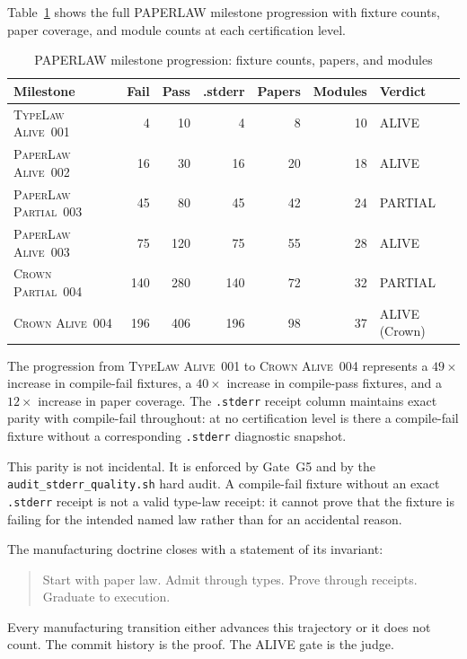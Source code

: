Table~\ref{tab:paperlaw-milestones} shows the full PAPERLAW milestone progression with
fixture counts, paper coverage, and module counts at each certification level.

\begin{table}[ht]
\centering
\caption{PAPERLAW milestone progression: fixture counts, papers, and modules}
\label{tab:paperlaw-milestones}
\begin{tabular}{@{}lrrrrrl@{}}
\toprule
\textbf{Milestone} & \textbf{Fail} & \textbf{Pass} & \textbf{.stderr} & \textbf{Papers} & \textbf{Modules} & \textbf{Verdict} \\
\midrule
\textsc{TypeLaw Alive~001}
  &   4 &  10 &   4 &  8  & 10 & ALIVE \\
\textsc{PaperLaw Alive~002}
  &  16 &  30 &  16 & 20  & 18 & ALIVE \\
\textsc{PaperLaw Partial~003}
  &  45 &  80 &  45 & 42  & 24 & PARTIAL \\
\textsc{PaperLaw Alive~003}
  &  75 & 120 &  75 & 55  & 28 & ALIVE \\
\textsc{Crown Partial~004}
  & 140 & 280 & 140 & 72  & 32 & PARTIAL \\
\textsc{Crown Alive~004}
  & 196 & 406 & 196 & 98  & 37 & ALIVE (Crown) \\
\bottomrule
\end{tabular}
\end{table}

The progression from \textsc{TypeLaw Alive~001} to \textsc{Crown Alive~004} represents a
$49\times$ increase in compile-fail fixtures, a $40\times$ increase in compile-pass
fixtures, and a $12\times$ increase in paper coverage. The \texttt{.stderr} receipt column
maintains exact parity with compile-fail throughout: at no certification level is there a
compile-fail fixture without a corresponding \texttt{.stderr} diagnostic snapshot.

This parity is not incidental. It is enforced by Gate~G5 and by the \texttt{audit\_stderr\_quality.sh}
hard audit. A compile-fail fixture without an exact \texttt{.stderr} receipt is not a valid
type-law receipt: it cannot prove that the fixture is failing for the intended named law
rather than for an accidental reason.

The manufacturing doctrine closes with a statement of its invariant:

\begin{quote}
Start with paper law. Admit through types. Prove through receipts. Graduate to execution.
\end{quote}

Every manufacturing transition either advances this trajectory or it does not count. The
commit history is the proof. The ALIVE gate is the judge.
